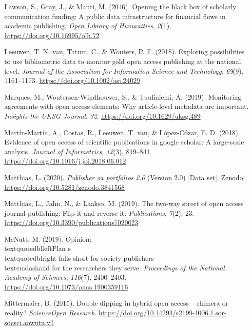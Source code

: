 \documentclass[a4paper,man,floatsintext,longtable,noextraspace,12pt]{apa6}
\newlength{\cslhangindent}
\newenvironment{cslreferences}%
  {\setlength{\parindent}{0pt}%
  \everypar{\setlength{\hangindent}{\cslhangindent}}\ignorespaces}%
  {\par}
\begin{document}
\begin{cslreferences}
\leavevmode\hypertarget{ref-Lawson_2016}{}%
Lawson, S., Gray, J., \& Mauri, M. (2016). Opening the black box of
scholarly communication funding: A public data infrastructure for
financial flows in academic publishing. \emph{Open Library of
Humanities}, \emph{2}(1). \url{https://doi.org/10.16995/olh.72}

\leavevmode\hypertarget{ref-van_Leeuwen_2018}{}%
Leeuwen, T. N. van, Tatum, C., \& Wouters, P. F. (2018). Exploring
possibilities to use bibliometric data to monitor gold open access
publishing at the national level. \emph{Journal of the Association for
Information Science and Technology}, \emph{69}(9), 1161--1173.
\url{https://doi.org/10.1002/asi.24029}

\leavevmode\hypertarget{ref-Marques_2019}{}%
Marques, M., Woutersen-Windhouwer, S., \& Tuuliniemi, A. (2019).
Monitoring agreements with open access elements: Why article-level
metadata are important. \emph{Insights the UKSG Journal}, \emph{32}.
\url{https://doi.org/10.1629/uksg.489}

\leavevmode\hypertarget{ref-Mart_n_Mart_n_2018}{}%
Martín-Martín, A., Costas, R., Leeuwen, T. van, \& López-Cózar, E. D.
(2018). Evidence of open access of scientific publications in google
scholar: A large-scale analysis. \emph{Journal of Informetrics},
\emph{12}(3), 819--841. \url{https://doi.org/10.1016/j.joi.2018.06.012}

\leavevmode\hypertarget{ref-Matthias_2020}{}%
Matthias, L. (2020). \emph{Publisher oa portfolios 2.0} (Version 2.0)
{[}Data set{]}. Zenodo. \url{https://doi.org/10.5281/zenodo.3841568}

\leavevmode\hypertarget{ref-Matthias_2019}{}%
Matthias, L., Jahn, N., \& Laakso, M. (2019). The two-way street of open
access journal publishing: Flip it and reverse it. \emph{Publications},
\emph{7}(2), 23. \url{https://doi.org/10.3390/publications7020023}

\leavevmode\hypertarget{ref-McNutt_2019}{}%
McNutt, M. (2019). Opinion: \\
textquotedblleftPlan s\\
textquotedblright falls short for society publishers\\
textemdashand for the researchers they serve. \emph{Proceedings of the
National Academy of Sciences}, \emph{116}(7), 2400--2403.
\url{https://doi.org/10.1073/pnas.1900359116}

\leavevmode\hypertarget{ref-Mittermaier_2015}{}%
Mittermaier, B. (2015). Double dipping in hybrid open access -- chimera
or reality? \emph{ScienceOpen Research}.
\url{https://doi.org/10.14293/s2199-1006.1.sor-socsci.aowntu.v1}


\end{cslreferences}
\end{document}
